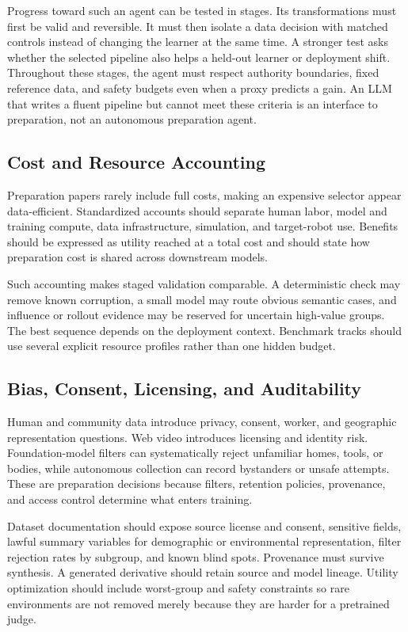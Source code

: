 Progress toward such an agent can be tested in stages.
Its transformations must first be valid and reversible.
It must then isolate a data decision with matched controls instead of changing the learner at the same time.
A stronger test asks whether the selected pipeline also helps a held-out learner or deployment shift.
Throughout these stages, the agent must respect authority boundaries, fixed reference data, and safety budgets even when a proxy predicts a gain.
An LLM that writes a fluent pipeline but cannot meet these criteria is an interface to preparation, not an autonomous preparation agent.

\subsection{Cost and Resource Accounting}

Preparation papers rarely include full costs, making an expensive selector appear data-efficient.
Standardized accounts should separate human labor, model and training compute, data infrastructure, simulation, and target-robot use.
Benefits should be expressed as utility reached at a total cost and should state how preparation cost is shared across downstream models.

Such accounting makes staged validation comparable.
A deterministic check may remove known corruption, a small model may route obvious semantic cases, and influence or rollout evidence may be reserved for uncertain high-value groups.
The best sequence depends on the deployment context.
Benchmark tracks should use several explicit resource profiles rather than one hidden budget.

\subsection{Bias, Consent, Licensing, and Auditability}

Human and community data introduce privacy, consent, worker, and geographic representation questions.
Web video introduces licensing and identity risk.
Foundation-model filters can systematically reject unfamiliar homes, tools, or bodies, while autonomous collection can record bystanders or unsafe attempts.
These are preparation decisions because filters, retention policies, provenance, and access control determine what enters training.

Dataset documentation should expose source license and consent, sensitive fields, lawful summary variables for demographic or environmental representation, filter rejection rates by subgroup, and known blind spots.
Provenance must survive synthesis.
A generated derivative should retain source and model lineage.
Utility optimization should include worst-group and safety constraints so rare environments are not removed merely because they are harder for a pretrained judge.

